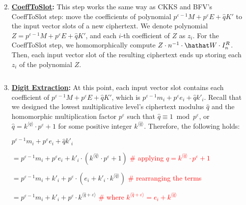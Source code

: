 \begin{enumerate}

$ $

\item \textbf{\textsf{\underline{CoeffToSlot}}:} This step works the same way as CKKS and BFV's \textsf{CoeffToSlot} step: move the coefficients of polynomial $p^{\varepsilon-1} M + p^\varepsilon E + \hat{q}K'$ to the input vector slots of a new ciphertext. We denote polynomial $Z = p^{\varepsilon-1} M + p^\varepsilon E + \hat{q}K'$, and each $i$-th coefficient of $Z$ as $z_i$. For the \textsf{CoeffToSlot} step, we homomorphically compute $Z \cdot n^{-1} \cdot \hathat W \cdot I_n^R$. Then, each input vector slot of the resulting ciphertext ends up storing each $z_i$ of the polynomial $Z$. 

$ $

\item \textbf{\underline{Digit Extraction}:} At this point, each input vector slot contains each coefficient of $p^{\varepsilon-1} M + p^\varepsilon E + \hat{q}K'$, which is $p^{\varepsilon-1} m_i + p^\varepsilon e_i + \hat{q}k'_i$. Recall that we designed the lowest multiplicative level's ciphertext modulus $\hat{q}$ and the homomorphic multiplication factor $p^\varepsilon$ such that $\hat{q} \equiv 1 \bmod p^\varepsilon$, or $\hat{q} = k^{\langle \hat{q} \rangle } \cdot p^\varepsilon + 1$ for some positive integer $k^{\langle \hat{q} \rangle }$. Therefore, the following holds: 

$p^{\varepsilon-1} m_i + p^\varepsilon e_i + \hat{q}k'_i$

$ = p^{\varepsilon-1} m_i + p^\varepsilon e_i + k'_i\cdot(k^{\langle \hat{q} \rangle } \cdot p^\varepsilon + 1) $  \textcolor{red}{ \# applying $\hat{q} = k^{\langle \hat{q} \rangle } \cdot p^\varepsilon + 1$}

$ = p^{\varepsilon-1} m_i + k'_i + p^\varepsilon  \cdot (e_i + k'_i\cdot k^{\langle \hat{q} \rangle }) $ \textcolor{red}{ \# rearranging the terms}

$ = p^{\varepsilon-1} m_i + k'_i + p^\varepsilon \cdot k^{\langle \hat{q} + \varepsilon \rangle } $ \textcolor{red}{ \# where $ k^{\langle \hat{q} + \varepsilon \rangle } = e_i + k^{\langle \hat{q} \rangle } $}


\end{enumerate}
